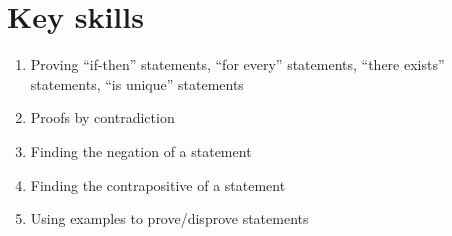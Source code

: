 \documentclass[12pt]{amsart}
\newcommand{\e}{\varepsilon}
\renewcommand{\d}{\delta}
\begin{document}
\section*{Key skills}

\begin{enumerate}
	\item Proving ``if-then'' statements, ``for every'' statements, ``there exists'' statements, ``is unique'' statements
	\item Proofs by contradiction
	\item Finding the negation of a statement
	\item Finding the contrapositive of a statement
	\item Using examples to prove/disprove statements
	\begin{comment}
	\item Proving that a number is the supremum of a set

	\item Proving that a sequence converges to some value using the definition
		\item Algebra with limits of sequences: using these to determine if a sequence converges, and to what
	\item Using squeeze theorem to show sequences converge


	\item Relationship between boundedness, convergence, and monotonicity
		\item Proofs by induction

	\item Relationship between convergence/boundedness of sequences and convergence of subsequences
	\item Using the Cauchy property to show a sequence converges

	\item Using the $\e-\d$ definition to compute limits
						
	\item Using algebra/squeeze theorem to compute limits

	\item Using the $\e-\d$ definition to show continuity

	\item Using algebra/compositions to show continuity
	\item Applying the $\e-\d$ definitions of limits and continuity 
			\item Applying the Intermediate Value Theorem
		\item Applying Boundedness and Extreme Value Theorems
		

	\item Evaluating derivatives by definition
	\item Evaluating derivatives by algebra and chain rule
	\item Using definition of derivative and Min-Max Theorem to determine when values of $f$ are larger / smaller than others
	\item Using definition of derivative and mean value theorem to determine increasing / decreasing behavior of functions
\end{comment}
\end{enumerate}
\end{document}
